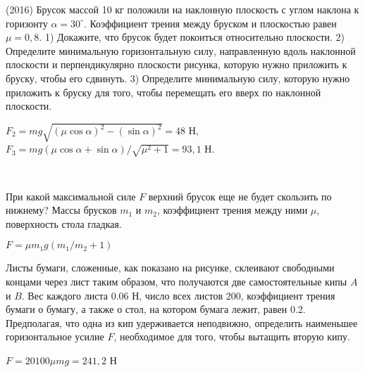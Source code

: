 \begin{ex}
(2016) Брусок массой 10 кг положили на наклонную плоскость с углом наклона к горизонту $\alpha = 30^{\circ}$. Коэффициент трения между бруском и плоскостью равен $\mu = 0,8$. 1) Докажите, что брусок будет покоиться относительно плоскости. 2) Определите минимальную горизонтальную силу, направленную вдоль наклонной плоскости и перпендикулярно плоскости рисунка, которую нужно приложить к бруску, чтобы его сдвинуть. 3) Определите минимальную силу‚ которую нужно приложить к бруску для того, чтобы перемещать его вверх по наклонной плоскости.
\begin{center}

\end{center}
\begin{ans}
$F_2 = mg \sqrt{(\mu \cos \alpha)^2 - (\sin \alpha)^2} = 48$ Н, $F_3 = mg(\mu \cos \alpha + \sin \alpha)/\sqrt{\mu^2 + 1} = 93,1$ Н. 
\end{ans}
\end{ex}

\begin{ex}
\hspace{0pt} \\
\begin{minipage}{.65\textwidth}
При какой максимальной силе $F$ верхний брусок еще не будет скользить по нижнему? Массы брусков $m_1$ и $m_2$, коэффициент трения между ними $\mu$, поверхность стола гладкая.
\end{minipage}
\begin{minipage}{.35\textwidth}
\centering

\end{minipage}
\begin{ans}
$F = \mu m_1 g \left(m_1/m_2 + 1 \right)$
\end{ans}
\end{ex}

\begin{ex}
Листы бумаги, сложенные, как показано на рисунке, склеивают свободными концами через лист таким образом, что получаются две самостоятельные кипы $A$ и $B$. Вес каждого листа 0.06 Н, число всех листов 200, коэффициент трения бумаги о бумагу, а также о стол, на котором бумага лежит, равен 0.2. Предполагая, что одна из кип удерживается неподвижно, определить наименьшее горизонтальное усилие $F$, необходимое для того, чтобы вытащить вторую кипу.
\begin{center}

\end{center}
\begin{ans}
$F = 20100 \mu mg = 241,2$ Н
\end{ans}
\end{ex}

